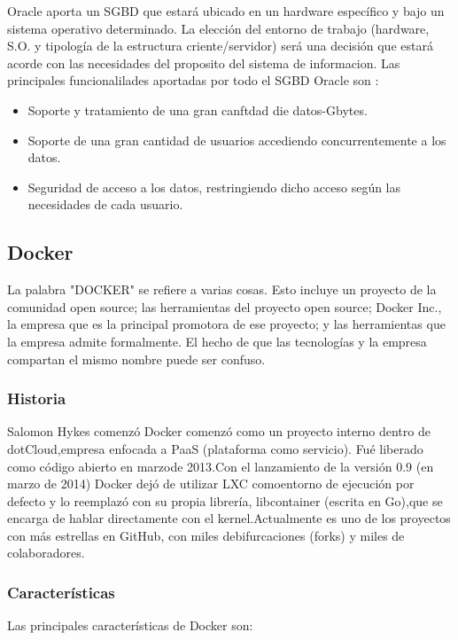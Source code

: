 \documentclass[preprint,12pt]{elsarticle}
\begin{document}
Oracle aporta un SGBD que estará ubicado en un hardware específico y bajo un sistema operativo determinado.
La elección del entorno de trabajo (hardware, S.O. y tipología de la estructura criente/servidor) será una decisión que estará acorde con las necesidades del proposito del sistema de informacion.
Las principales funcionalilades aportadas por todo el SGBD Oracle son :
\begin{itemize}
\item Soporte y tratamiento de una gran canftdad die datos-Gbytes.
\item  Soporte de una gran cantidad de usuarios accediendo concurrentemente a los datos.
\item  Seguridad de acceso a los datos, restringiendo dicho acceso según las necesidades de cada usuario.
\end{itemize}

\subsection {\textbf{Docker}}
La palabra "DOCKER" se refiere a varias cosas. Esto incluye un proyecto de la comunidad open source; las herramientas del proyecto open source; Docker Inc., la empresa que es la principal promotora de ese proyecto; y las herramientas que la empresa admite formalmente. El hecho de que las tecnologías y la empresa compartan el mismo nombre puede ser confuso.
\subsubsection{\textbf{Historia}}
Salomon Hykes comenzó Docker comenzó como un proyecto interno dentro de dotCloud,empresa enfocada a PaaS (plataforma como servicio). Fué liberado como código abierto en marzode 2013.Con el lanzamiento de la versión 0.9 (en marzo de 2014) Docker dejó de utilizar LXC comoentorno de ejecución por defecto y lo reemplazó con su propia librería, libcontainer (escrita en Go),que se encarga de hablar directamente con el kernel.Actualmente es uno de los proyectos con más estrellas en GitHub, con miles debifurcaciones (forks) y miles de colaboradores.

\subsubsection{\textbf{Características}}
Las principales características de Docker son:
\end{document}
